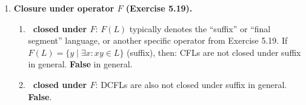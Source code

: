 \begin{enumerate}[{10.}1. ]
\begin{enumerate}
\item \textbf{\PSIG\ closed under $P$}: $P(L) = \{x \mid \exists y: xy \in L\}$ (prefix language). If $L$ is CFL with PDA $M$ (accepting via empty stack), then $P(L)$ is recognized by modifying $M$ to accept at any configuration reached on input $x$ that could be extended to an accepting computation. Since the PDA is nondeterministic, $P(L)$ is CFL. \textbf{True}.

\item \textbf{\ASIG\ closed under $P$}: For DPDAs, the prefix language is also DCFL. \textbf{True}.
\end{enumerate}

\item \textbf{Closure under operator $F$ (Exercise 5.19).}

\begin{enumerate}
\item \textbf{\PSIG\ closed under $F$}: $F(L)$ typically denotes the ``suffix'' or ``final segment'' language, or another specific operator from Exercise 5.19. If $F(L) = \{y \mid \exists x: xy \in L\}$ (suffix), then: CFLs are not closed under suffix in general. \textbf{False} in general.

\item \textbf{\ASIG\ closed under $F$}: DCFLs are also not closed under suffix in general. \textbf{False}.
\end{enumerate}

\end{enumerate}

